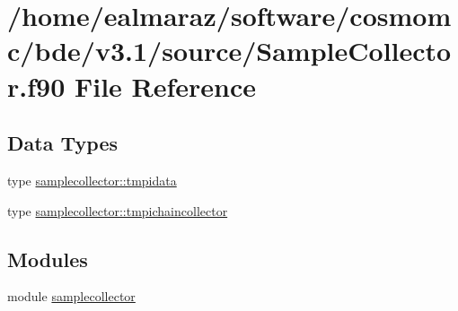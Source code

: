 \hypertarget{SampleCollector_8f90}{}\section{/home/ealmaraz/software/cosmomc/bde/v3.1/source/\+Sample\+Collector.f90 File Reference}
\label{SampleCollector_8f90}
\subsection*{Data Types}
\begin{DoxyCompactItemize}
\item 
type \mbox{\hyperlink{structsamplecollector_1_1tmpidata}{samplecollector\+::tmpidata}}
\item 
type \mbox{\hyperlink{structsamplecollector_1_1tmpichaincollector}{samplecollector\+::tmpichaincollector}}
\end{DoxyCompactItemize}
\subsection*{Modules}
\begin{DoxyCompactItemize}
\item 
module \mbox{\hyperlink{namespacesamplecollector}{samplecollector}}
\end{DoxyCompactItemize}
